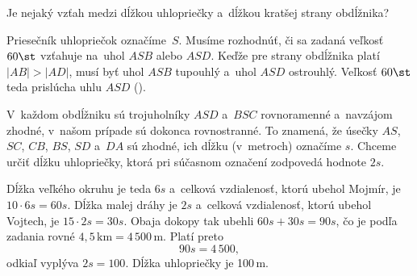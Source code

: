 {%
\napad
Je nejaký vzťah medzi dĺžkou uhlopriečky a~dĺžkou kratšej strany obdĺžnika?

\riesenie
Priesečník uhlopriečok označíme~$S$.
Musíme rozhodnúť, či sa zadaná veľkosť $60\st$ vzťahuje na~uhol $ASB$ alebo $ASD$.
Keďže pre strany obdĺžnika platí $|AB|>|AD|$, musí byť uhol $ASB$
tupouhlý a~uhol $ASD$ ostrouhlý.
Veľkosť $60\st$ teda prislúcha uhlu $ASD$ (\obr).

V~každom obdĺžniku sú trojuholníky $ASD$ a~$BSC$ rovnoramenné a~navzájom
zhodné, v~našom prípade sú dokonca rovnostranné.
To znamená, že úsečky $AS$, $SC$, $CB$, $BS$, $SD$ a~$DA$ sú zhodné,
ich dĺžku (v~metroch) označíme $s$.
Chceme určiť dĺžku uhlopriečky, ktorá pri súčasnom označení zodpovedá hodnote
$2s$.

Dĺžka veľkého okruhu je teda $6s$ a~celková vzdialenosť, ktorú ubehol Mojmír,
je ${10\cdot 6s}=60s$.
Dĺžka malej dráhy je $2s$ a~celková vzdialenosť, ktorú ubehol Vojtech, je
$15\cdot 2s=30s$.
Obaja dokopy tak ubehli $60s+30s=90s$, čo je podľa zadania rovné
$4{,}5\,\text{km}=4\,500\,\text{m}$.
Platí preto
$$
90s=4\,500,
$$
odkiaľ vyplýva $2s=100$.
Dĺžka uhlopriečky je 100\,m.}


